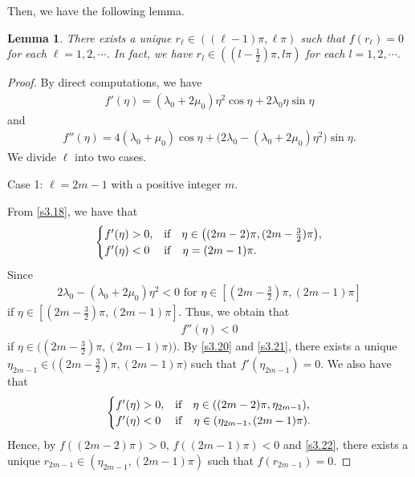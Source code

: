 \documentclass[a4paper,12pt]{article}
\newtheorem{lemma}[Th]{Lemma}
\newtheorem{a priori condition}[Th]{A priori condition}
\begin{document}
\medskip\noindent
Then, we have the following lemma.
\begin{lemma}\label{s_lem3.3}
There exists a unique $r_\ell\in((\ell-1)\pi, \ell \pi)$ such that $f(r_\ell)=0$ for each  $\ell=1,2,\cdots$. In fact, we have
$r_l\in((l-\frac{1}{2})\pi, l\pi)$ for each  $l=1,2,\cdots$. 
\end{lemma}
\begin{proof}
By direct computations, we have
\begin{equation}\label{s3.18}
\begin{aligned}
f'(\eta)=(\lambda_0+2\mu_0)\eta^2\cos\eta+2\lambda_0\eta\sin\eta
\end{aligned}
\end{equation}
and
\begin{equation}\label{s3.19}
\begin{aligned}
f''(\eta)=4(\lambda_0+\mu_0)\cos\eta+\big(2\lambda_0-(\lambda_0+2\mu_0)\eta^2\big)\sin\eta.
\end{aligned}
\end{equation}
We divide $\ell$ into two cases.

\medskip
\noindent
Case 1: $\ell=2m-1$ with a positive integer $m$.

From \eqref{s3.18}, we have that 
\begin{equation}\label{s3.20}
\begin{array}{l}
\begin{cases}
f'(\eta)>0,&\mbox{\rm if}\quad \eta\in\big((2m-2)\pi, (2m-\frac{3}{2})\pi\big),\\
f'(\eta)<0    & {\rm if}\quad \eta=(2m-1)\pi.
\end{cases}
\end{array}
\end{equation}
Since
\begin{equation*}
\begin{aligned}
2\lambda_0-(\lambda_0+2\mu_0)\eta^2<0\,\,\text{for}\,\,\eta\in[(2m-\frac{3}{2})\pi,(2m-1)\pi]
\end{aligned}
\end{equation*}
if $\eta\in[(2m-\frac{3}{2})\pi,(2m-1)\pi]$. Thus, we obtain that
\begin{equation}\label{s3.21}
\begin{aligned}
f''(\eta)<0
\end{aligned}
\end{equation}
if $\eta\in\big((2m-\frac{3}{2})\pi,(2m-1)\pi)\big)$. 
By \eqref{s3.20} and \eqref{s3.21}, there exists a unique $\eta_{2m-1}\in \big((2m-\frac{3}{2})\pi,(2m-1)\pi\big)$ such that $f'(\eta_{2m-1})=0$. We also have that
\begin{equation}\label{s3.22}
\begin{array}{l}
\begin{cases}
f'(\eta)>0,&\mbox{\rm if}\quad \eta\in((2m-2)\pi, \eta_{2m-1}),\\
f'(\eta)<0    & {\rm if}\quad \eta\in(\eta_{2m-1}, (2m-1)\pi).
\end{cases}
\end{array}
\end{equation}
Hence, by $f((2m-2)\pi)> 0$, $f((2m-1)\pi)< 0$ and \eqref{s3.22}, there exists a unique $r_{2m-1}\in (\eta_{2m-1},(2m-1)\pi)$ such that $f(r_{2m-1})=0$.


\end{proof}
\end{document}
